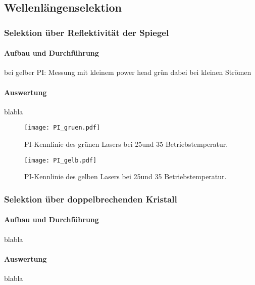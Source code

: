 \subsection{Wellenlängenselektion}

\subsubsection{Selektion über Reflektivität der Spiegel}

\paragraph{Aufbau und Durchführung}

bei gelber PI:
Messung mit kleinem power head
grün dabei bei kleinen Strömen


\paragraph{Auswertung}
blabla

\begin{figure}[H]
\begin{center}
  \texttt{[image: PI\_gruen.pdf]}
  \caption{PI-Kennlinie des grünen Lasers bei 25\grad und 35\grad
  Betriebstemperatur.}
  \label{img:PI_gruen}
\end{center}
\end{figure}


\begin{figure}[H]
\begin{center}
  \texttt{[image: PI\_gelb.pdf]}
  \caption{PI-Kennlinie des gelben Lasers bei 25\grad und 35\grad
  Betriebstemperatur.}
  \label{img:PI_gelb}
\end{center}
\end{figure}



\subsubsection{Selektion über doppelbrechenden Kristall}


\paragraph{Aufbau und Durchführung}
blabla

\paragraph{Auswertung}
blabla

